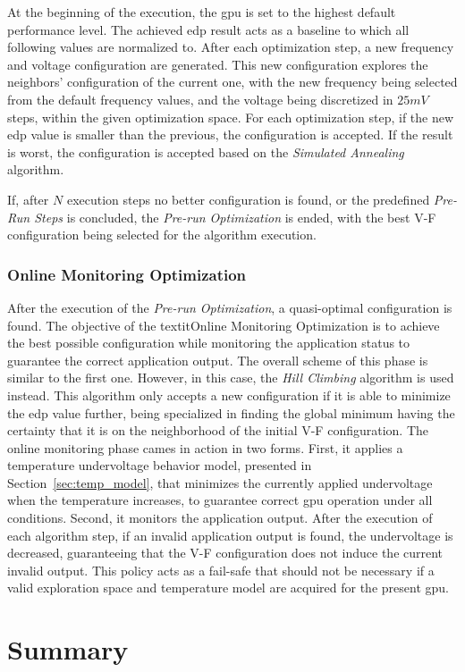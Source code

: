 At the beginning of the execution, the \acrshort{gpu} is set to the highest default performance level. The achieved \acrshort{edp} result acts as a baseline to which all following values are normalized to. After each optimization step, a new frequency and voltage configuration are generated. This new configuration explores the neighbors' configuration of the current one, with the new frequency being selected from the default frequency values, and the voltage being discretized in $25mV$ steps, within the given optimization space. 
For each optimization step, if the new \acrshort{edp} value is smaller than the previous, the configuration is accepted. If the result is worst, the configuration is accepted based on the \textit{Simulated Annealing} algorithm.

If, after $ N $ execution steps no better configuration is found, or the predefined \textit{Pre-Run Steps} is concluded, the \textit{Pre-run Optimization} is ended, with the best V-F configuration being selected for the algorithm execution.

\subsubsection{Online Monitoring Optimization}

After the execution of the \textit{Pre-run Optimization}, a quasi-optimal configuration is found. The objective of the textit{Online Monitoring Optimization} is to achieve the best possible configuration while monitoring the application status to guarantee the correct application output. The overall scheme of this phase is similar to the first one. However, in this case, the \textit{Hill Climbing} algorithm is used instead. This algorithm only accepts a new configuration if it is able to minimize the \acrshort{edp} value further, being specialized in finding the global minimum having the certainty that it is on the neighborhood of the initial V-F configuration. The online monitoring phase cames in action in two forms. First, it applies a temperature undervoltage behavior model, presented in Section~\ref{sec:temp_model},  that minimizes the currently applied undervoltage when the temperature increases, to guarantee correct \acrshort{gpu} operation under all conditions. Second, it monitors the application output. After the execution of each algorithm step, if an invalid application output is found, the undervoltage is decreased, guaranteeing that the V-F configuration does not induce the current invalid output. This policy acts as a fail-safe that should not be necessary if a valid exploration space and temperature model are acquired for the present \acrshort{gpu}.



\section{Summary}